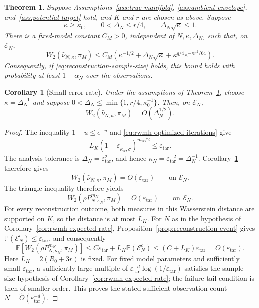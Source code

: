 \documentclass[10pt,a4paper]{amsart}
\newtheorem{theorem}{Theorem}
\newtheorem{corollary}{Corollary}
\newcommand{\E}{\mathbb E}
\newcommand{\Pp}{\mathbb P}
\newcommand{\cE}{\mathcal E}
\newcommand{\eps}{\varepsilon}
\renewcommand{\epsilon}{\eps}
\newcommand{\whatnu}{\widehat\nu_{N,\kappa}}
\begin{document}
\begin{theorem}
\label{thm:main-w2}
Suppose Assumptions~\ref{ass:true-manifold},
\ref{ass:ambient-envelope}, and~\ref{ass:potential-target} hold, and $K$
and $r$ are chosen as above. Suppose
\[
 \kappa\ge\kappa_0,
 \qquad 0<\Delta_N\le r/4,
 \qquad \Delta_N\sqrt\kappa\le1.
\]
There is a fixed-model constant $C_M>0$, independent of
$N,\kappa,\Delta_N$, such that, on $\cE_N$,
\begin{equation}
 W_2(\whatnu,\pi_M)
 \le C_M\left(
 \kappa^{-1/2}+\Delta_N\sqrt\kappa
 +\kappa^{q/4}e^{-\kappa r^2/64}
 \right).
\label{eq:main-w2-bound}
\end{equation}
Consequently, if \eqref{eq:reconstruction-sample-size} holds, this bound
holds with probability at least $1-\alpha_N$ over the observations.
\end{theorem}

\begin{corollary}[Small-error rate]
\label{cor:optimized}
Under the assumptions of Theorem~\ref{thm:main-w2}, choose
$\kappa=\Delta_N^{-1}$ and suppose
$0<\Delta_N\le\min\{1,r/4,\kappa_0^{-1}\}$.
Then, on $\cE_N$,
\begin{equation}
 W_2(\whatnu,\pi_M)=O(\Delta_N^{1/2}).
\label{eq:Delta-half}
\end{equation}
\end{corollary}

\begin{proof}
The inequality $1-u\le e^{-u}$ and
\eqref{eq:rwmh-optimized-iterations} give
\[
 L_K(1-\underline\varepsilon_{\kappa_N,\sigma})^{m_N/2}
 \le\epsilon_{\mathrm{tar}}.
\]
The analysis tolerance is $\Delta_N=\epsilon_{\mathrm{tar}}^2$, and hence
$\kappa_N=\epsilon_{\mathrm{tar}}^{-2}=\Delta_N^{-1}$.
Corollary~\ref{cor:optimized} therefore gives
\[
 W_2(\whatnu,\pi_M)=O(\epsilon_{\mathrm{tar}})
 \qquad\text{on }\cE_N.
\]
The triangle inequality therefore yields
\[
 W_2(\rho P_{N,\kappa_N}^{m_N},\pi_M)
 =O(\epsilon_{\mathrm{tar}})
 \qquad\text{on }\cE_N.
\]
For every reconstruction outcome, both measures in this Wasserstein
distance are supported on $K$, so the distance is at most $L_K$.
For $N$ as in the hypothesis of Corollary~\ref{cor:rwmh-expected-rate},
Proposition~\ref{prop:reconstruction-event} gives
$\Pp(\cE_N^c)\le\epsilon_{\mathrm{tar}}$, and consequently
\[
 \E\left[
 W_2(\rho P_{N,\kappa_N}^{m_N},\pi_M)
 \right]
 \le C\epsilon_{\mathrm{tar}}
   +L_K\Pp(\cE_N^c)
 \le(C+L_K)\epsilon_{\mathrm{tar}}
 =O(\epsilon_{\mathrm{tar}}).
\]
Here $L_K=2(R_0+3r)$ is fixed. For fixed model parameters and sufficiently
small $\epsilon_{\mathrm{tar}}$, a sufficiently large multiple of
$\epsilon_{\mathrm{tar}}^{-d}\log(1/\epsilon_{\mathrm{tar}})$ satisfies
the sample-size hypothesis of Corollary~\ref{cor:rwmh-expected-rate}; the
failure-tail condition is then of smaller order. This proves the stated
sufficient observation count $N=\widetilde O(\epsilon_{\mathrm{tar}}^{-d})$.
\end{proof}
\end{document}
